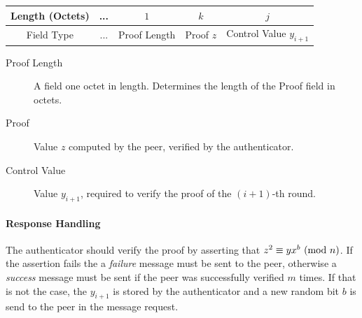 \begin{center}
\begin{tabular}{|c|c|c|c|c|}
	\hline
	Length (Octets) & ... & $1$ & $k $ & $j$\\
	\hline
	Field Type & ... & Proof Length & Proof $z$ & Control Value $y_{i+1}$\\ %
	\hline
\end{tabular}
\end{center}

\begin{description}
	\item [Proof Length] A field one octet in length. Determines the length of the Proof field in octets.
	\item [Proof] Value $z$ computed by the peer, verified by the authenticator.
	\item [Control Value] Value $y_{i+1}$, required to verify the proof of the $(i+1)$-th round.
\end{description}

\paragraph{Response Handling}
The authenticator should verify the proof by asserting that $z^2 \equiv yx^b \ (\mathrm{mod}\ n)$.
If the assertion fails the a \textit{failure} message must be sent to the peer, otherwise a \textit{success} message must be sent if the peer was successfully verified $m$ times.
If that is not the case, the $y_{i+1}$ is stored by the authenticator and a new random bit $b$ is send to the peer in the message request.

